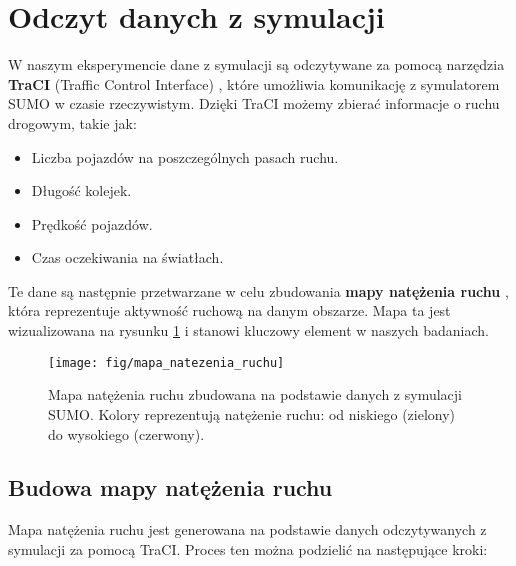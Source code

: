\documentclass[12pt, a4paper]{article} %
\begin{document}
    \section{Odczyt danych z symulacji}

    W naszym eksperymencie dane z symulacji są odczytywane za pomocą narzędzia
    \textbf{TraCI} (Traffic Control Interface)
    , które umożliwia komunikację z symulatorem SUMO w czasie rzeczywistym. Dzięki TraCI możemy zbierać informacje o
    ruchu drogowym, takie jak:
    \begin{itemize}
        \item Liczba pojazdów na poszczególnych pasach ruchu.
        \item Długość kolejek.
        \item Prędkość pojazdów.
        \item Czas oczekiwania na światłach.
    \end{itemize}

    Te dane są następnie przetwarzane w celu zbudowania \textbf{mapy natężenia ruchu}
    , która reprezentuje aktywność ruchową na danym obszarze. Mapa ta jest wizualizowana na rysunku
    \ref{fig:mapa_natezenia_ruchu} i stanowi kluczowy element w naszych badaniach.

    \begin{figure}[h]
        \centering
        \texttt{[image: fig/mapa\_natezenia\_ruchu]}
        \caption
        {Mapa natężenia ruchu zbudowana na podstawie danych z symulacji SUMO. Kolory reprezentują natężenie ruchu: od
        niskiego (zielony) do wysokiego (czerwony).}
        \label{fig:mapa_natezenia_ruchu}
    \end{figure}

    \subsection{Budowa mapy natężenia ruchu}
    Mapa natężenia ruchu jest generowana na podstawie danych odczytywanych z symulacji za pomocą TraCI. Proces ten można
    podzielić na następujące kroki:
\end{document}
